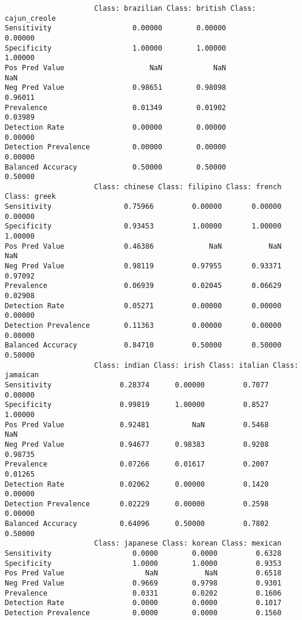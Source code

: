 \documentclass{article}
\begin{document}
\begin{verbatim}
                     Class: brazilian Class: british Class: cajun_creole
Sensitivity                   0.00000        0.00000             0.00000
Specificity                   1.00000        1.00000             1.00000
Pos Pred Value                    NaN            NaN                 NaN
Neg Pred Value                0.98651        0.98098             0.96011
Prevalence                    0.01349        0.01902             0.03989
Detection Rate                0.00000        0.00000             0.00000
Detection Prevalence          0.00000        0.00000             0.00000
Balanced Accuracy             0.50000        0.50000             0.50000
                     Class: chinese Class: filipino Class: french Class: greek
Sensitivity                 0.75966         0.00000       0.00000      0.00000
Specificity                 0.93453         1.00000       1.00000      1.00000
Pos Pred Value              0.46386             NaN           NaN          NaN
Neg Pred Value              0.98119         0.97955       0.93371      0.97092
Prevalence                  0.06939         0.02045       0.06629      0.02908
Detection Rate              0.05271         0.00000       0.00000      0.00000
Detection Prevalence        0.11363         0.00000       0.00000      0.00000
Balanced Accuracy           0.84710         0.50000       0.50000      0.50000
                     Class: indian Class: irish Class: italian Class: jamaican
Sensitivity                0.28374      0.00000         0.7077         0.00000
Specificity                0.99819      1.00000         0.8527         1.00000
Pos Pred Value             0.92481          NaN         0.5468             NaN
Neg Pred Value             0.94677      0.98383         0.9208         0.98735
Prevalence                 0.07266      0.01617         0.2007         0.01265
Detection Rate             0.02062      0.00000         0.1420         0.00000
Detection Prevalence       0.02229      0.00000         0.2598         0.00000
Balanced Accuracy          0.64096      0.50000         0.7802         0.50000
                     Class: japanese Class: korean Class: mexican
Sensitivity                   0.0000        0.0000         0.6328
Specificity                   1.0000        1.0000         0.9353
Pos Pred Value                   NaN           NaN         0.6518
Neg Pred Value                0.9669        0.9798         0.9301
Prevalence                    0.0331        0.0202         0.1606
Detection Rate                0.0000        0.0000         0.1017
Detection Prevalence          0.0000        0.0000         0.1560

\end{verbatim}
\end{document}
